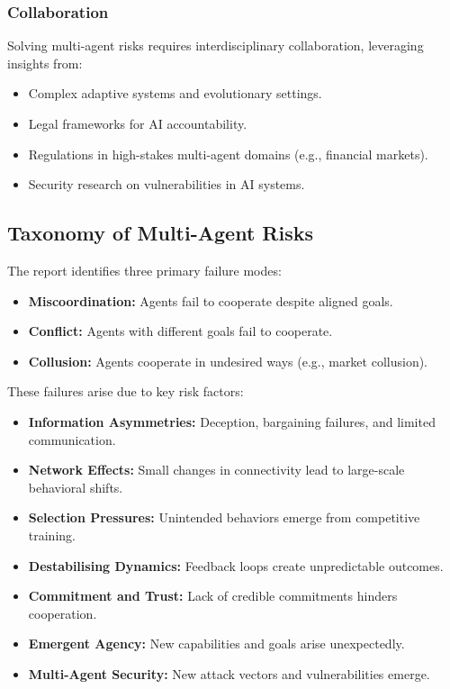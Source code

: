 \documentclass{article}
\begin{document}
\subsubsection{Collaboration}
Solving multi-agent risks requires interdisciplinary collaboration, leveraging insights from:
\begin{itemize}
    \item Complex adaptive systems and evolutionary settings.
    \item Legal frameworks for AI accountability.
    \item Regulations in high-stakes multi-agent domains (e.g., financial markets).
    \item Security research on vulnerabilities in AI systems.
\end{itemize}

\subsection{Taxonomy of Multi-Agent Risks}
The report identifies three primary failure modes:
\begin{itemize}
    \item \textbf{Miscoordination:} Agents fail to cooperate despite aligned goals.
    \item \textbf{Conflict:} Agents with different goals fail to cooperate.
    \item \textbf{Collusion:} Agents cooperate in undesired ways (e.g., market collusion).
\end{itemize}
These failures arise due to key risk factors:
\begin{itemize}
    \item \textbf{Information Asymmetries:} Deception, bargaining failures, and limited communication.
    \item \textbf{Network Effects:} Small changes in connectivity lead to large-scale behavioral shifts.
    \item \textbf{Selection Pressures:} Unintended behaviors emerge from competitive training.
    \item \textbf{Destabilising Dynamics:} Feedback loops create unpredictable outcomes.
    \item \textbf{Commitment and Trust:} Lack of credible commitments hinders cooperation.
    \item \textbf{Emergent Agency:} New capabilities and goals arise unexpectedly.
    \item \textbf{Multi-Agent Security:} New attack vectors and vulnerabilities emerge.
\end{itemize}
\end{document}
